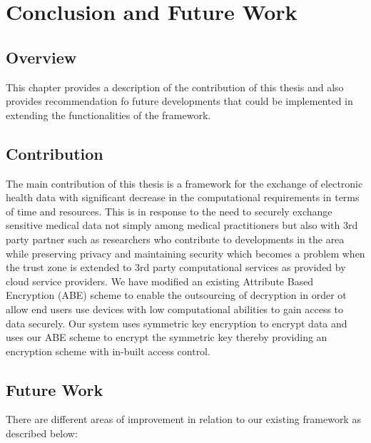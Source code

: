 \chapter{Conclusion and Future Work}
\label{chap:conclusions}

\section{Overview}

This chapter provides a description of the contribution of this thesis and also provides recommendation fo future developments that could be implemented in extending the functionalities of the framework.

\section{Contribution}

The main contribution of this thesis is a framework for the exchange of electronic health data with significant decrease in the computational requirements in terms of time and resources. This is in response to the need to  securely exchange sensitive medical data not simply among medical practitioners but also with 3rd party partner such as researchers who contribute to developments in the area while preserving privacy and maintaining security which becomes a problem when the trust zone is extended to 3rd party computational services as provided by cloud service providers. We have modified an existing Attribute Based Encryption (ABE) scheme to enable the outsourcing of decryption in order ot allow end users use devices with low computational abilities to gain access to data securely. Our system uses symmetric key encryption to encrypt data and uses our ABE scheme to encrypt the symmetric key thereby providing an encryption scheme with in-built access control.

\section{Future Work}

There are different areas of improvement in relation to our existing framework as described below:

